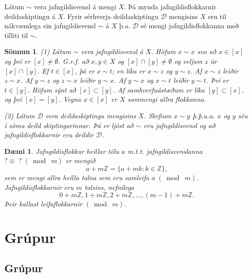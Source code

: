 \documentclass[a4paper,icelandic,11pt]{book}
\theoremstyle{plain}
\newtheorem{daemi}{Dæmi}[chapter]
\newtheorem*{sonnun}{Sönnun}
\newcommand{\Z}{\mathbb{Z}}
\begin{document}
\begin{setn}
  Látum $\sim$ vera jafngildisvensl á mengi $X$. Þá mynda jafngildisflokkarnir
  deildaskiptingu á $X$. Fyrir sérhverja deildaskiptingu $\mathcal D$
  mengisins $X$ eru til nákvæmlega ein jafngildisvensl $\sim$ á $X$ þ.a.
  $\mathcal D$ sé mengi jafngildisflokkanna með tilliti til $\sim$.
\end{setn}
\begin{sonnun}
  (1) Látum $\sim$ vera jafngildisvensl á $X$. Höfum $x\sim x$ svo að $x\in
  [x]$ og því er $[x]\neq \emptyset$. G.r.f. að $x,y\in X$ og $[x]\cap [y]
  \neq \emptyset$ og veljum $z$ úr $[x]\cap [y]$. Ef $t\in [x]$, þá er $x\sim
  t$; en líka er $x\sim z$ og $y\sim z$. Af $x\sim z$ leiðir $z\sim x$. Af
  $y\sim z$ og $z\sim x$ leiðir $y\sim x$. Af $y\sim x$ og $x\sim t$ leiðir
  $y\sim t$. Því er $t\in [y]$. Höfum sýnt að $[x] \subset [y]$. Af
  samhverfuástæðum er líka $[y]\subset [x]$, og því $[x] = [y]$. Vegna $x\in
  [x]$ er $X$ sammengi allra flokkanna.

  (2) Látum $\mathcal D$ vera deildaskiptingu mengisins $X$. Skrfium $x\sim y$
  þ.þ.a.a. $x$ og $y$ séu í sömu deild skiptingarinnar. Þá er ljóst að $\sim$
  eru jafngildisvensl og að jafngildisflokkarnir eru deildir $\mathcal D$.
\end{sonnun}

\begin{daemi}
  Jafngildisflokkur heillar tölu $a$ m.t.t. jafngildisvenslanna $ ? \equiv
  \;?\; (\bmod \; m)$ er mengið
  \[ a + m\Z = \{ a + mk : k\in \Z \} , \]
  sem er mengi allra heilla talna sem eru samleifa $a\; (\bmod \; m)$.
  Jafngildisflokkarnir eru $m$ talsins, nefnilega
  \[ 0+m\Z, 1+m\Z, 2+m\Z, \dots, (m-1) + m\Z . \]
  Þeir kallast \emph{leifaflokkarnir} $(\bmod \; m)$.
\end{daemi}

\part{Grúpur}
\chapter{Grúpur}
\end{document}

